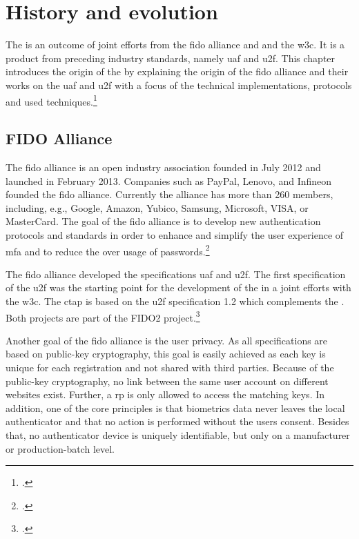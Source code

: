 
\section{History and evolution}

The \wa{} is an outcome of joint efforts from the \gls{fido} alliance and and the \gls{w3c}. It is a product from preceding industry standards, namely \gls{uaf} and \gls{u2f}. This chapter introduces the origin of the \wa{} by explaining the origin of the \gls{fido} alliance and their works on the \gls{uaf} and \gls{u2f} with a focus of the technical implementations, protocols and used techniques.\footcites[See][24]{fido-ct-3}

\subsection{FIDO Alliance}
\label{subsec:fido_alliance}

The \gls{fido} alliance is an open industry association founded in July 2012 and launched in February 2013. Companies such as PayPal, Lenovo, and Infineon founded the \gls{fido} alliance. Currently the alliance has more than 260 members, including, e.g., Google, Amazon, Yubico, Samsung, Microsoft, VISA, or MasterCard. The goal of the \gls{fido} alliance is to develop new authentication protocols and standards in order to enhance and simplify the user experience of \gls{mfa} and to reduce the over usage of passwords.\footcites[See][583]{eckert-it-sec-9}[See][17]{fido-ct-2}

The \gls{fido} alliance developed the specifications \gls{uaf} and \gls{u2f}. The first specification of the \gls{u2f} was the starting point for the development of the \wa{} in a joint efforts with the \gls{w3c}. The \gls{ctap} is based on the \gls{u2f} specification 1.2 which complements the \wa. Both projects are part of the FIDO2 project.\footcite[See][169--170]{grimes2017hacking}

Another goal of the \gls{fido} alliance is the user privacy. As all specifications are based on public-key cryptography, this goal is easily achieved as each key is unique for each registration and not shared with third parties. Because of the public-key cryptography, no link between the same user account on different websites exist. Further, a \gls{rp} is only allowed to access the matching keys. In addition, one of the core principles is that biometrics data never leaves the local authenticator and that no action is performed without the users consent. Besides that, no authenticator device is uniquely identifiable, but only on a manufacturer or production-batch level.